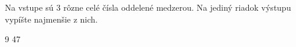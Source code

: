 




Na vstupe sú 3 rôzne celé čísla oddelené medzerou. Na jediný riadok výstupu vypíšte najmenšie z nich.

 9 47
\koniec


